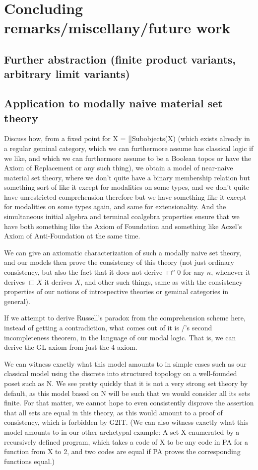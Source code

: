 \filestart

\section{Concluding remarks/miscellany/future work}
\subsection{Further abstraction (finite product variants, arbitrary limit variants)}
\TODO

\subsection{Application to modally naive material set theory}

\begin{TODOblock}
Discuss how, from a fixed point for X = []Subobjects(X) (which exists already in a regular geminal category, which we can furthermore assume has classical logic if we like, and which we can furthermore assume to be a Boolean topos or have the Axiom of Replacement or any such thing), we obtain a model of near-naive material set theory, where we don't quite have a binary membership relation but something sort of like it except for modalities on some types, and we don't quite have unrestricted comprehension therefore but we have something like it except for modalities on some types again, and same for extensionality. And the simultaneous initial algebra and terminal coalgebra properties ensure that we have both something like the Axiom of Foundation and something like Aczel's Axiom of Anti-Foundation at the same time.

We can give an axiomatic characterization of such a modally naive set theory, and our models then prove the consistency of this theory (not just ordinary consistency, but also the fact that it does not derive $\Box^n 0$ for any $n$, whenever it derives $\Box X$ it derives $X$, and other such things, same as with the consistency properties of our notions of introspective theories or geminal categories in general).

If we attempt to derive Russell's paradox from the comprehension scheme here, instead of getting a contradiction, what comes out of it is \Goedel/'s second incompleteness theorem, in the language of our modal logic. That is, we can derive the GL axiom from just the 4 axiom.

We can witness exactly what this model amounts to in simple cases such as our classical model using the discrete into structured topology on a well-founded poset such as N. We see pretty quickly that it is not a very strong set theory by default, as this model based on N will be such that we would consider all its sets finite. For that matter, we cannot hope to even consistently disprove the assertion that all sets are equal in this theory, as this would amount to a proof of consistency, which is forbidden by G2IT. (We can also witness exactly what this model amounts to in our other archetypal example: A set X enumerated by a recursively defined program, which takes a code of X to be any code in PA for a function from X to 2, and two codes are equal if PA proves the corresponding functions equal.)


\end{TODOblock}
